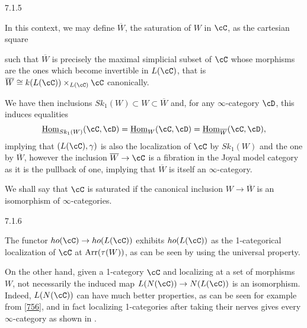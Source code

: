 \documentclass[a4paper,fontsize=12pt]{scrartcl}
\begin{document}
\begin{rmk}\label{715}
  7.1.5

  In this context, we may define $\overline{W}$, the saturation of $W$ in $\cC$,
  as the cartesian square

  such that $\overline{W}$ is precisely the maximal simplicial subset of $\cC$
  whose morphisms are the ones which become invertible in $L(\cC)$, that is
  $\overline{W}\cong k(L(\cC))\times_{L(\cC)}\cC$ canonically.

  We have then inclusions $Sk_1(W)\subset W\subset\overline{W}$ and, for any
  $\infty$-category $\cD$, this induces equalities
  \[\Home_{Sk_1(W)}(\cC,\cD)=\Home_{W}(\cC,\cD)=\Home_{\overline{W}}(\cC,\cD),\]
  implying that $(L(\cC),\gamma)$ is also the localization of $\cC$ by $Sk_1(W)$
  and the one by $\overline{W}$, however the inclusion
  $\overline{W}\rightarrow\cC$ is a fibration in the Joyal model category as it
  is the pullback of one, implying that $\overline{W}$ is itself an
  $\infty$-category.

  We shall say that $\cC$ is saturated if the canonical inclusion
  $W\rightarrow\overline{W}$ is an isomorphism of $\infty$-categories.
\end{rmk}

\begin{rmk}
  7.1.6

  The functor $ho(\cC)\rightarrow ho(L(\cC))$ exhibits $ho(L(\cC))$ as the
  1-categorical localization of $\cC$ at $\operatorname{Arr}(\tau(W))$, as can be seen by
  using the universal property.

  On the other hand, given a 1-category $\cC$ and localizing at a set of
  morphisms $W$, not necessarily the induced map $L(N(\cC))\rightarrow
  N(L(\cC))$ is an isomorphism. Indeed, $L(N(\cC))$ can have much better
  properties, as can be seen for example from \ref{756}, and in fact localizing
  1-categories after taking their nerves gives every $\infty$-category as shown
  in \cite[Prop.\ 7.3.15]{Cis19}.
\end{rmk}
\end{document}
